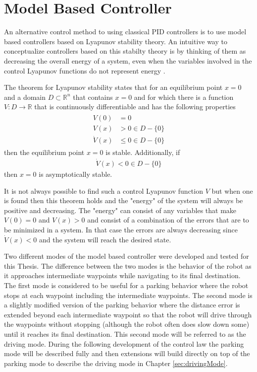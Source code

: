 \section{Model Based Controller}
\label{sec:lyapunov}
An alternative control method to using classical PID controllers is to use model based controllers based on Lyapunov stability theory. An intuitive way to conceptualize controllers based on this stabilty theory is by thinking of them as decreasing the overall energy of a system, even when the variables involved in the control Lyapunov functions do not represent energy \cite{Khalil02}.

The theorem for Lyapunov stability states that for an equilibrium point $x=0$ and a domain $D\subset\mathbb{R}^n$ that contains $x=0$ and for which there is a function $V:D\to\mathbb{R}$ that is continuously differentiable and has the following properties 
\begin{align}
\label{eq:lyapunovTheorem}
\begin{split}
V(0) &= 0 \\
V(x) &> 0 \in D-\{0\} \\
\dot{V}(x) &\leq 0 \in D-\{0\}
\end{split}
\end{align}
then the equilibrium point $x=0$ is stable. Additionally, if
\begin{align}
\label{eq:lyapunovAsymptoticStability}
\dot{V}(x) < 0 \in D - \{0\}
\end{align}
then $x=0$ is asymptotically stable.

It is not always possible to find such a control Lyapunov function $V$ but when one is found then this theorem holds and the "energy" of the system will always be positive and decreasing. The "energy" can consist of any variables that make $V(0) = 0$ and $V(x) > 0$ and consist of a combination of the errors that are to be minimized in a system. In that case the errors are always decreasing since $\dot{V}(x) < 0$ and the system will reach the desired state.

Two different modes of the model based controller were developed and tested for this Thesis. The difference between the two modes is the behavior of the robot as it approaches intermediate waypoints while navigating to its final destination. The first mode is considered to be useful for a parking behavior where the robot stops at each waypoint including the intermediate waypoints. The second mode is a slightly modified version of the parking behavior where the distance error is extended beyond each intermediate waypoint so that the robot will drive through the waypoints without stopping (although the robot often does slow down some) until it reaches its final destination. This second mode will be referred to as the driving mode. During the following development of the control law the parking mode will be described fully and then extensions will build directly on top of the parking mode to describe the driving mode in Chapter \ref{sec:drivingMode}.

